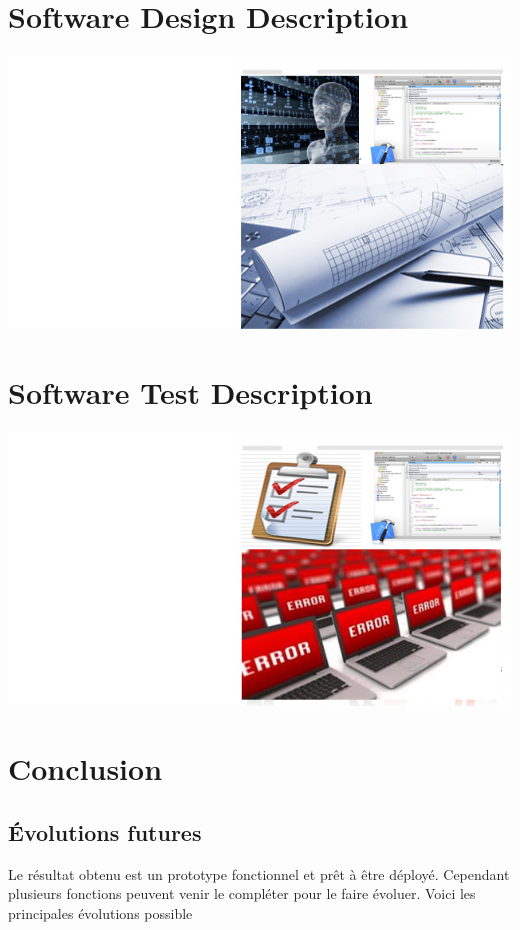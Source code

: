 \documentclass[12pt,a4paper,twoside]{report}
\begin{document}
\chapter{Software Design Description\label{sdd}}
\vspace{6cm}
\includegraphics[width=1\textwidth]{../comon/figures/sddPic.jpg}
\cleardoublepage


\cleardoublepage
\chapter{Software Test Description\label{std}}
\vspace{6cm}
\includegraphics[width=1\textwidth]{../comon/figures/stdPic.jpg}
\cleardoublepage


\cleardoublepage
\chapter{Conclusion}
\cleardoublepage
\section{Évolutions futures}
Le résultat obtenu est un prototype fonctionnel et prêt à être déployé. Cependant plusieurs fonctions peuvent venir le compléter pour le faire évoluer.
Voici les principales évolutions possible 
\end{document}
